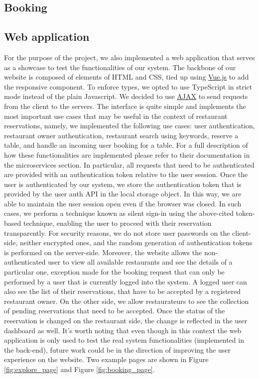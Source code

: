 \subsection{Booking}


\subsection{Web application}
For the purpose of the project, we also implemented a web application that serves
as a showcase to test the functionalities of our system. The backbone of our website
is composed of elements of HTML and CSS, tied up using \href{https://vuejs.org/}{Vue.js}
to add the responsive component. To enforce types, we opted to use TypeScript
in strict mode instead of the plain Javascript. We decided to use
\href{https://en.wikipedia.org/wiki/Ajax_(programming)}{AJAX} to send requests from the client to the servers. The interface is quite simple and implements the most important use cases that may be useful in the context of restaurant reservations, namely, we implemented the following use cases: user authentication, restaurant owner authentication, restaurant search using keywords, reserve a table, and handle an incoming user booking for a table. For a full description of how these functionalities are implemented please refer to their documentation in the microservices section. In particular, all requests that need to be authenticated are provided with an authentication token relative to the user session. Once the user is authenticated by our system, we store the authentication token that is provided by the user auth API in the local storage object. In this way, we are able to maintain the user session open even if the browser was closed. In such cases, we perform a technique known as silent sign-in using the above-cited token-based technique, enabling the user to proceed with their reservation transparently. For security reasons, we do not store user passwords on the client-side, neither encrypted ones, and the random generation of authentication tokens is performed on the server-side. Moreover, the website allows the non-authenticated user to view all available restaurants and see the details of a particular one, exception made for the booking request that can only be performed by a user that is currently logged into the system. A logged user can also see the list of their reservations, that have to be accepted by a registered restaurant owner. On the other side, we allow restaurateurs to see the collection of pending reservations that need to be accepted. Once the status of the reservation is changed on the restaurant side, the change is reflected in the user dashboard as well. It's worth noting that even though in this context the web application is only used to test the real system functionalities (implemented in the back-end), future work could be in the direction of improving the user experience on the website.
Two example pages are shown in Figure \ref{fig:explore_page} and Figure \ref{fig:booking_page}.

